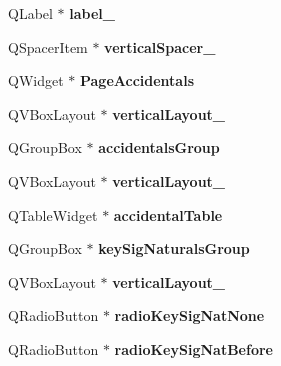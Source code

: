 \begin{DoxyCompactItemize}
Q\+Label $\ast$ {\bfseries label\+\_}
\item 
\mbox{\label{class_ui___edit_style_base_a00020d08047474bc2da5c446d78ac4f5}} 
Q\+Spacer\+Item $\ast$ {\bfseries vertical\+Spacer\+\_}
\item 
\mbox{\label{class_ui___edit_style_base_a8e59c7c1198d5914caefcf75e93050f6}} 
Q\+Widget $\ast$ {\bfseries Page\+Accidentals}
\item 
\mbox{\label{class_ui___edit_style_base_ae4d3af7c7e35330ddc4ca8024b810b44}} 
Q\+V\+Box\+Layout $\ast$ {\bfseries vertical\+Layout\+\_}
\item 
\mbox{\label{class_ui___edit_style_base_a272e1840974e68db46398d6cbac18b2d}} 
Q\+Group\+Box $\ast$ {\bfseries accidentals\+Group}
\item 
\mbox{\label{class_ui___edit_style_base_aae2399b027e4ba769cb3380d99648c74}} 
Q\+V\+Box\+Layout $\ast$ {\bfseries vertical\+Layout\+\_}
\item 
\mbox{\label{class_ui___edit_style_base_aed829b8fef0ed147208256a1bf649e5c}} 
Q\+Table\+Widget $\ast$ {\bfseries accidental\+Table}
\item 
\mbox{\label{class_ui___edit_style_base_aa4abe963150421b540b255bab549a98a}} 
Q\+Group\+Box $\ast$ {\bfseries key\+Sig\+Naturals\+Group}
\item 
\mbox{\label{class_ui___edit_style_base_aef08b9c2dc7158c28e8e3c56b0aeb870}} 
Q\+V\+Box\+Layout $\ast$ {\bfseries vertical\+Layout\+\_}
\item 
\mbox{\label{class_ui___edit_style_base_a60c55bda94bb13ad7b8779c51c5b3eef}} 
Q\+Radio\+Button $\ast$ {\bfseries radio\+Key\+Sig\+Nat\+None}
\item 
\mbox{\label{class_ui___edit_style_base_abac8463a9ce20d58a07dea46ad066ea4}} 
Q\+Radio\+Button $\ast$ {\bfseries radio\+Key\+Sig\+Nat\+Before}

\end{DoxyCompactItemize}
